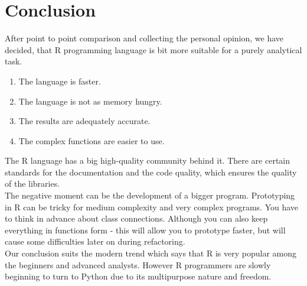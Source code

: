 \documentclass[
  twoside,
  11pt, a4paper,
  footinclude=true,
  headinclude=true,
  cleardoublepage=empty
]{scrreprt}
\begin{document}
    \section{Conclusion}
    After point to point comparison and collecting the personal opinion, we have decided, that R programming language is bit more suitable for a purely analytical task.
    \begin{enumerate}
        \item The language is faster.
        \item The language is not as memory hungry.
        \item The results are adequately accurate. 
        \item The complex functions are easier to use.
    \end{enumerate}
    The R language has a big high-quality community behind it. There are certain standards for the documentation and the code quality, which ensures the quality of the libraries.\\
    The negative moment can be the development of a bigger program. Prototyping in R can be tricky for medium complexity and very complex programs. You have to think in advance about class connections. Although you can also keep everything in functions form - this will allow you to prototype faster, but will cause some difficulties later on during refactoring.\\
    Our conclusion suits the modern trend which says that R is very popular among the beginners and advanced analysts. However R programmers are slowly beginning to turn to Python due to its multipurpose nature and freedom.

    
    
\iffalse
\end{document}
